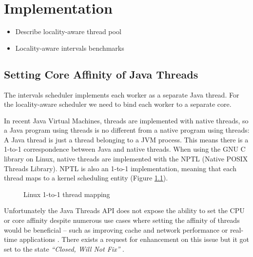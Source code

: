 
\chapter{Implementation}
\label{chap:locality-implementation}


\begin{itemize}
\item Describe locality-aware thread pool
\item Locality-aware intervals benchmarks
\end{itemize}

\section{Setting Core Affinity of Java Threads}
\label{sec:locality-implementation-core-affinity}

The intervals scheduler implements each worker as a separate Java
thread. For the locality-aware scheduler we need to bind each worker
to a separate core.

In recent Java Virtual Machines, threads are implemented with native
threads, so a Java program using threads is no different from a native
program using threads: A Java thread is just a thread belonging to a
JVM process. This means there is a 1-to-1 correspondence between Java
and native threads. When using the GNU C library on Linux, native
threads are implemented with the NPTL (Native POSIX Threads
Library). NPTL is also an 1-to-1 implementation, meaning that each
thread maps to a kernel scheduling entity (Figure
\ref{fig:core-affinity-thread-mapping}).

\begin{figure}[htb]
  \centering
  \caption{Linux 1-to-1 thread mapping}
  \label{fig:core-affinity-thread-mapping}
\end{figure}

Unfortunately the Java Threads API does not expose the ability to set
the CPU or core affinity despite numerous use cases where setting the
affinity of threads would be beneficial -- such as improving cache and
network performance or real-time applications \cite{Love2003, Dow2005,
  Foong2008}. There exists a request for enhancement on this issue but
it got set to the state \emph{``Closed, Will Not Fix''}
\cite{Oracle1999}.

